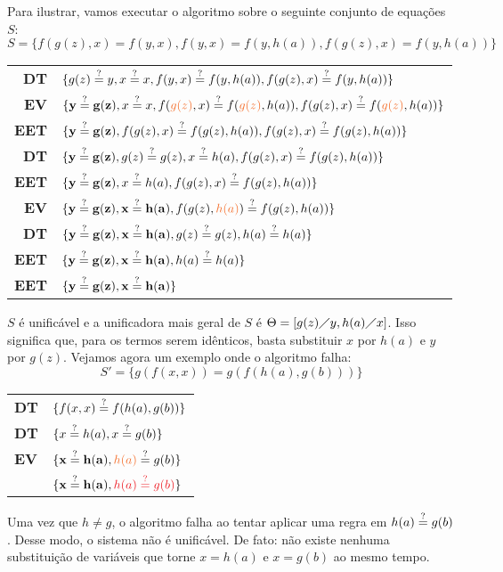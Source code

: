 Para ilustrar, vamos executar o algoritmo sobre o seguinte conjunto de equações $S$:
\[S = \{f(g(z), x) = f(y, x), f(y,x) = f(y,h(a)), f(g(z), x) = f(y, h(a))\}\]
\begin{center}
    \begin{tabular}{r l}
        \textbf{DT} & $\{g(z) \overset{?}{=} y, x \overset{?}{=} x, f(y,x) \overset{?}{=} f(y,h(a)), f(g(z), x) \overset{?}{=} f(y, h(a))\}$ \\
        \textbf{EV} & $\{\mathbf{y \? g(z)}, x \? x, f({\color{Orange}g(z)},x) \? f({\color{Orange}g(z)},h(a)), f(g(z), x) \? f({\color{Orange}g(z)}, h(a))\}$ \\
        \textbf{EET} & $\{\mathbf{y \overset{?}{=} g(z)}, f(g(z),x) \overset{?}{=} f(g(z),h(a)), f(g(z), x) \overset{?}{=} f(g(z), h(a))\}$ \\
        \textbf{DT} & $\{\mathbf{y \overset{?}{=} g(z)}, g(z) \overset{?}{=} g(z), x \overset{?}{=} h(a), f(g(z), x) \overset{?}{=} f(g(z), h(a))\}$ \\
        \textbf{EET} & $\{\mathbf{y \overset{?}{=} g(z)}, x \overset{?}{=} h(a), f(g(z), x) \overset{?}{=} f(g(z), h(a))\}$ \\
        \textbf{EV} & $\{\mathbf{y \? g(z)}, \mathbf{x \? h(a)}, f(g(z), {\color{Orange}h(a)}) \? f(g(z), h(a))\}$ \\
        \textbf{DT} & $\{\mathbf{y \overset{?}{=} g(z)}, \mathbf{x \overset{?}{=} h(a)}, g(z) \overset{?}{=} g(z), h(a) \overset{?}{=} h(a)\}$ \\
        \textbf{EET} & $\{\mathbf{y \overset{?}{=} g(z)}, \mathbf{x \overset{?}{=} h(a)}, h(a) \overset{?}{=} h(a)\}$ \\
        \textbf{EET} & $\{\mathbf{y \overset{?}{=} g(z)}, \mathbf{x \overset{?}{=} h(a)}\}$ 
    \end{tabular}
\end{center}
$S$ é unificável e a unificadora mais geral de $S$ é $\Theta = [g(z)\diagup y, h(a) \diagup x]$. Isso significa que, para os termos serem idênticos, basta substituir $x$ por $h(a)$ e $y$ por $g(z)$. Vejamos agora um exemplo onde o algoritmo falha:
\[S' = \{g(f(x,x)) = g(f(h(a), g(b)))\}\]
\begin{center}
    \begin{tabular}{l l}
        \textbf{DT} & $\{f(x,x) \overset{?}{=} f(h(a), g(b))\}$ \\
        \textbf{DT} & $\{x \overset{?}{=} h(a), x \overset{?}{=} g(b)\}$ \\
        \textbf{EV} & $\{\mathbf{x \? h(a)}, {\color{Orange}h(a)} \? g(b)\}$ \\
        & $\{\mathbf{x \? h(a)}, {\color{Red}h(a) \? g(b)}\}$
    \end{tabular}
\end{center}

Uma vez que $h \neq g$, o algoritmo falha ao tentar aplicar uma regra em $h(a) \overset{?}{=} g(b)$. Desse modo, o sistema não é unificável. De fato: não existe nenhuma substituição de variáveis que torne $x = h(a)$ e $x = g(b)$ ao mesmo tempo. 

